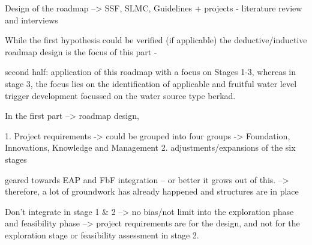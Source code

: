 Design of the roadmap --> SSF, SLMC, Guidelines + projects - literature review and interviews

While the first hypothesis could be verified (if applicable) the deductive/inductive roadmap design is the focus of this part -

second half: application of this roadmap with a focus on Stages 1-3, whereas in stage 3, the focus lies on the identification of applicable and fruitful water level trigger development focussed on the water source type berkad.  


In the first part
--> roadmap design, 

1. Project requirements -> could be grouped into four groups -> Foundation, Innovations, Knowledge and Management 
2. adjustments/expansions of the six stages





geared towards EAP and FbF integration -- or better it grows out of this. --> therefore, a lot of groundwork has already happened and structures are in place

Don't integrate in stage 1 \& 2 --> no bias/not limit into the exploration phase and feasibility phase --> project requirements are for the design, and not for the exploration stage or feasibility assessment in stage 2.


